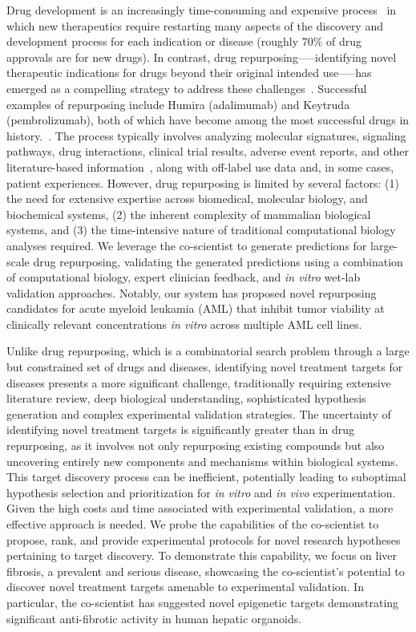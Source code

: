 Drug development is an increasingly time-consuming and expensive process~\citep{ringel2020breaking} in which new therapeutics require restarting many aspects of the discovery and development process for each indication or disease (roughly 70\% of drug approvals are for new drugs). In contrast, drug repurposing—--identifying novel therapeutic indications for drugs beyond their original intended use--—has emerged as a compelling strategy to address these challenges~\citep{pushpakom2019drug}. Successful examples of repurposing include Humira (adalimumab) and Keytruda (pembrolizumab), both of which have become among the most successful drugs in history.~\citep{pushpakom2019drug}. The process typically involves analyzing molecular signatures, signaling pathways, drug interactions, clinical trial results, adverse event reports, and other literature-based information~\citep{xia2024drug}, along with off-label use data and, in some cases, patient experiences. However, drug repurposing is limited by several factors: (1) the need for extensive expertise across biomedical, molecular biology, and biochemical systems, (2) the inherent complexity of mammalian biological systems, and (3) the time-intensive nature of traditional computational biology analyses required. We leverage the co-scientist to generate predictions for large-scale drug repurposing, validating the generated predictions using a combination of computational biology, expert clinician feedback, and \textit{in vitro} wet-lab validation approaches. Notably, our system has proposed novel repurposing candidates for acute myeloid leukamia (AML) that inhibit tumor viability at clinically relevant concentrations \textit{in vitro} across multiple AML cell lines.

Unlike drug repurposing, which is a combinatorial search problem through a large but constrained set of drugs and diseases, identifying novel treatment targets for diseases presents a more significant challenge, traditionally requiring extensive literature review, deep biological understanding, sophisticated hypothesis generation and complex experimental validation strategies. The uncertainty of identifying novel treatment targets is significantly greater than in drug repurposing, as it involves not only repurposing existing compounds but also uncovering entirely new components and mechanisms within biological systems. This target discovery process can be inefficient, potentially leading to suboptimal hypothesis selection and prioritization for \textit{in vitro} and \textit{in vivo} experimentation. Given the high costs and time associated with experimental validation, a more effective approach is needed. We probe the capabilities of the co-scientist to propose, rank, and provide experimental protocols for novel research hypotheses pertaining to target discovery. To demonstrate this capability, we focus on liver fibrosis, a prevalent and serious disease, showcasing the co-scientist's potential to discover novel treatment targets amenable to experimental validation. In particular, the co-scientist has suggested novel epigenetic targets demonstrating significant anti-fibrotic activity in human hepatic organoids.

